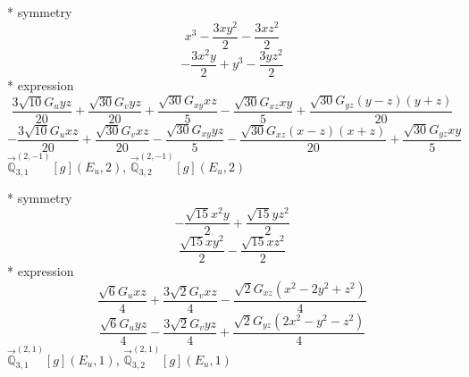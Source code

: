 \documentclass[fleqn,8pt]{jsarticle}
\begin{document}
\noindent\quad ** symmetry
\begin{dmath*}
x^{3} - \frac{3 x y^{2}}{2} - \frac{3 x z^{2}}{2}
\end{dmath*}
\begin{dmath*}
- \frac{3 x^{2} y}{2} + y^{3} - \frac{3 y z^{2}}{2}
\end{dmath*}
\noindent\quad ** expression
\begin{dmath*}
\frac{3 \sqrt{10} G_{u} y z}{20} + \frac{\sqrt{30} G_{v} y z}{20} + \frac{\sqrt{30} G_{xy} x z}{5} - \frac{\sqrt{30} G_{xz} x y}{5} + \frac{\sqrt{30} G_{yz} \left(y - z\right) \left(y + z\right)}{20}
\end{dmath*}
\begin{dmath*}
- \frac{3 \sqrt{10} G_{u} x z}{20} + \frac{\sqrt{30} G_{v} x z}{20} - \frac{\sqrt{30} G_{xy} y z}{5} - \frac{\sqrt{30} G_{xz} \left(x - z\right) \left(x + z\right)}{20} + \frac{\sqrt{30} G_{yz} x y}{5}
\end{dmath*}
\noindent\quad $\vec{\mathbb{Q}}_{3,1}^{(2,-1)}[g](E_{u},2)$, $\vec{\mathbb{Q}}_{3,2}^{(2,-1)}[g](E_{u},2)$

\noindent\quad ** symmetry
\begin{dmath*}
- \frac{\sqrt{15} x^{2} y}{2} + \frac{\sqrt{15} y z^{2}}{2}
\end{dmath*}
\begin{dmath*}
\frac{\sqrt{15} x y^{2}}{2} - \frac{\sqrt{15} x z^{2}}{2}
\end{dmath*}
\noindent\quad ** expression
\begin{dmath*}
\frac{\sqrt{6} G_{u} x z}{4} + \frac{3 \sqrt{2} G_{v} x z}{4} - \frac{\sqrt{2} G_{xz} \left(x^{2} - 2 y^{2} + z^{2}\right)}{4}
\end{dmath*}
\begin{dmath*}
\frac{\sqrt{6} G_{u} y z}{4} - \frac{3 \sqrt{2} G_{v} y z}{4} + \frac{\sqrt{2} G_{yz} \left(2 x^{2} - y^{2} - z^{2}\right)}{4}
\end{dmath*}
\noindent\quad $\vec{\mathbb{Q}}_{3,1}^{(2,1)}[g](E_{u},1)$, $\vec{\mathbb{Q}}_{3,2}^{(2,1)}[g](E_{u},1)$
\end{document}
